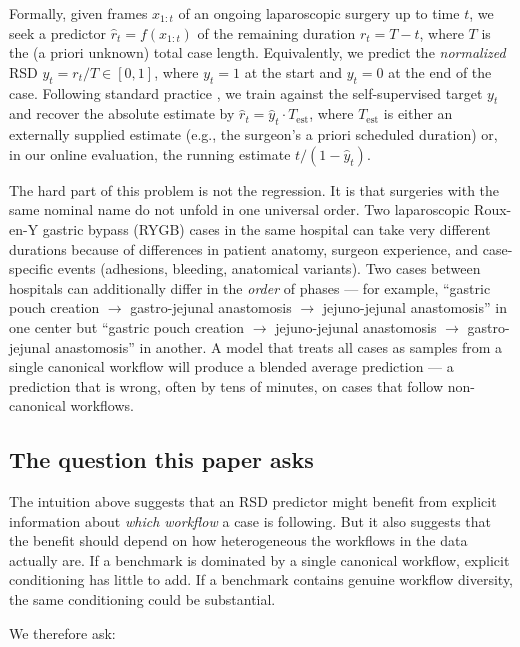 Formally, given frames \(x_{1:t}\) of an ongoing laparoscopic surgery up
to time \(t\), we seek a predictor \(\hat{r}_t = f(x_{1:t})\) of the
remaining duration \(r_t = T - t\), where \(T\) is the (a priori
unknown) total case length. Equivalently, we predict the
\emph{normalized} RSD \(y_t = r_t / T \in [0, 1]\), where \(y_t = 1\) at
the start and \(y_t = 0\) at the end of the case. Following standard
practice \citep{twinanda2019rsdnet}, we train against the self-supervised
target \(y_t\) and recover the absolute estimate by
\(\hat{r}_t = \hat{y}_t \cdot
T_{\text{est}}\), where \(T_{\text{est}}\) is either an externally
supplied estimate (e.g., the surgeon's a priori scheduled duration) or,
in our online evaluation, the running estimate \(t / (1 - \hat{y}_t)\).

The hard part of this problem is not the regression. It is that
surgeries with the same nominal name do not unfold in one universal
order. Two laparoscopic Roux-en-Y gastric bypass (RYGB) cases in the
same hospital can take very different durations because of differences
in patient anatomy, surgeon experience, and case-specific events
(adhesions, bleeding, anatomical variants). Two cases between hospitals
can additionally differ in the \emph{order} of phases --- for example,
``gastric pouch creation $\rightarrow$ gastro-jejunal anastomosis $\rightarrow$ jejuno-jejunal
anastomosis'' in one center but ``gastric pouch creation $\rightarrow$
jejuno-jejunal anastomosis $\rightarrow$ gastro-jejunal anastomosis'' in another. A
model that treats all cases as samples from a single canonical workflow
will produce a blended average prediction --- a prediction that is
wrong, often by tens of minutes, on cases that follow non-canonical
workflows.

\subsection{The question this paper asks}\label{the-question-this-paper-asks}

The intuition above suggests that an RSD predictor might benefit from
explicit information about \emph{which workflow} a case is following.
But it also suggests that the benefit should depend on how heterogeneous
the workflows in the data actually are. If a benchmark is dominated by a
single canonical workflow, explicit conditioning has little to add. If a
benchmark contains genuine workflow diversity, the same conditioning
could be substantial.

We therefore ask:

